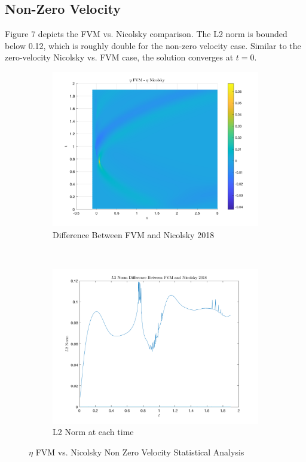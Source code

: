 \documentclass{article}
\begin{document}
\subsection{Non-Zero Velocity}

Figure 7 depicts the FVM vs. Nicolsky comparison. The L2 norm is bounded below 0.12, which is roughly double for the non-zero velocity case. Similar to the zero-velocity Nicolsky vs. FVM case, the solution converges at $t=0$.


\begin{figure}[t!]
    \centering
    \begin{subfigure}[b]{0.5\textwidth}
        \centering
        \includegraphics[scale=.25]{images/diff_FVM_Nicolsky_non0u.png} 
        \caption{Difference Between FVM and Nicolsky 2018}
    \end{subfigure}%
    ~ 
    \begin{subfigure}[b]{0.5\textwidth}
        \centering
        \includegraphics[scale=.25]{images/l2_FVM_Nicolsky_non0u.png}
        \caption{L2 Norm at each time}
    \end{subfigure}
    \caption{$\eta$ FVM vs. Nicolsky Non Zero Velocity Statistical Analysis}
\end{figure}
\end{document}
